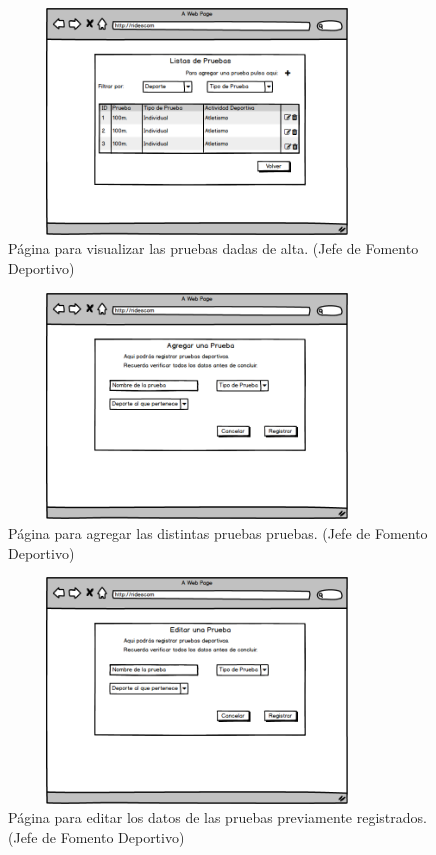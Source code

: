 		\begin{figure} [hbt!]
			\centering
			\includegraphics[width=10cm, height=6cm]{Imagenes/Nuevos/P25_Pruebas_JFD}
			\caption{Página para visualizar las pruebas dadas de alta. (Jefe de Fomento Deportivo)}
			\label{pruebas}
		\end{figure}
		\pagebreak
		
		\begin{figure} [hbt!]
			\centering
			\includegraphics[width=10cm, height=6cm]{Imagenes/Nuevos/P26_AgregarPruebas_JFD}
			\caption{Página para agregar las distintas pruebas pruebas. (Jefe de Fomento Deportivo)}
			\label{agregarpruebas}
		\end{figure}
		
		\begin{figure} [hbt!]
			\centering
			\includegraphics[width=10cm, height=6cm]{Imagenes/Nuevos/P26_EditarPruebas_JFD}
			\caption{Página para editar los datos de las pruebas previamente registrados. (Jefe de Fomento Deportivo)}
			\label{editarpruebas}
		\end{figure}
	

